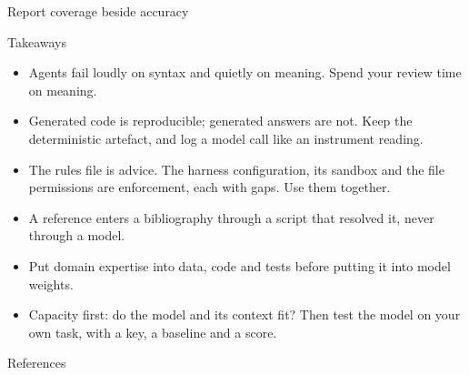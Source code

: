 \documentclass[11pt,aspectratio=169]{beamer}
\begin{document}
\begin{frame}{Report coverage beside accuracy}
\end{frame}

\begin{frame}{Takeaways}
  \begin{itemize}
    \item Agents fail loudly on syntax and quietly on meaning. Spend your
      review time on meaning.
    \item Generated code is reproducible; generated answers are not. Keep
      the deterministic artefact, and log a model call like an instrument
      reading.
    \item The rules file is advice. The harness configuration, its sandbox
      and the file permissions are enforcement, each with gaps. Use them
      together.
    \item A reference enters a bibliography through a script that resolved
      it, never through a model.
    \item Put domain expertise into data, code and tests before putting it
      into model weights.
    \item Capacity first: do the model and its context fit? Then test the
      model on your own task, with a key, a baseline and a score.
  \end{itemize}
\end{frame}

\begin{frame}[allowframebreaks]{References}
  \printbibliography[heading=none]
\end{frame}
\end{document}
